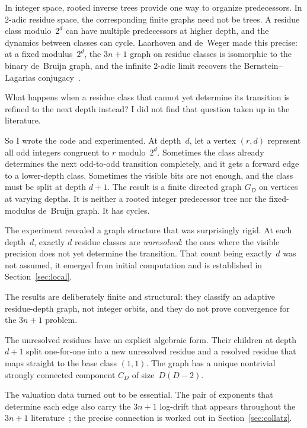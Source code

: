 \documentclass[11pt]{amsart}
\theoremstyle{definition}
\theoremstyle{remark}
\begin{document}
In integer space, rooted inverse trees provide one way to organize
predecessors.  In $2$-adic residue space, the corresponding finite graphs need
not be trees.  A residue class modulo~$2^d$ can have multiple predecessors at
higher depth, and the dynamics between classes can cycle.  Laarhoven and
de~Weger made this precise: at a fixed modulus~$2^d$, the $3n+1$ graph on
residue classes is isomorphic to the binary de~Bruijn graph, and the infinite
$2$-adic limit recovers the Bernstein--Lagarias
conjugacy~\cite{LaarhovenDeWeger2013}.

What happens when a residue class that cannot yet determine its transition is
refined to the next depth instead?  I did not find that question taken up in
the literature.

So I wrote the code and experimented.  At depth~$d$, let a vertex $(r,d)$ represent all odd
integers congruent to $r$ modulo~$2^d$.  Sometimes the class already
determines the next odd-to-odd transition completely, and it gets a forward
edge to a lower-depth class.  Sometimes the visible bits are not enough, and
the class must be split at depth $d+1$.  The result is a finite directed graph
$G_D$ on vertices at varying depths.  It is neither a rooted integer predecessor tree nor
the fixed-modulus de~Bruijn graph.  It has cycles.

The experiment revealed a graph structure that was surprisingly rigid.  At each 
depth~$d$, exactly $d$ residue classes are \emph{unresolved}: the ones where the visible 
precision does not yet determine the transition.  That count being exactly~$d$ was 
not assumed, it emerged from initial computation and is established in Section~\ref{sec:local}.

The results are deliberately finite and structural: they classify an adaptive
residue-depth graph, not integer orbits, and they do not prove convergence for
the $3n+1$ problem.

The unresolved residues have an explicit algebraic form.  Their
children at depth $d+1$ split one-for-one into a new unresolved residue and a
resolved residue that maps straight to the base class $(1,1)$.  The graph has
a unique nontrivial strongly connected component $C_D$ of
size~$D(D-2)$.

The valuation data turned out to be essential.  The pair of exponents that
determine each edge also carry the $3n+1$ log-drift that appears throughout
the $3n+1$ literature~\cite{Terras1976, Everett1977, Eliahou1993, Tao2022};
the precise connection is worked out in Section~\ref{sec:collatz}.
\end{document}
